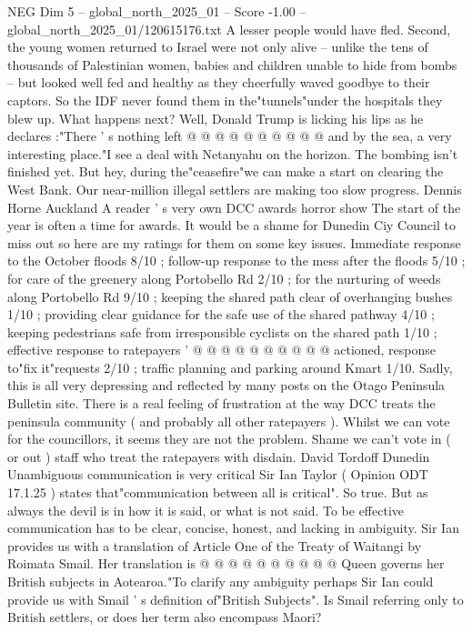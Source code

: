 \begin{textsample}{NEG Dim 5 – global\_north\_2025\_01 – Score -1.00 – global\_north\_2025\_01/120615176.txt}
A lesser people would have fled.
Second, the young women returned to Israel were not only alive -- unlike the tens of thousands of Palestinian women, babies and children unable to hide from bombs -- but looked well fed and healthy as they cheerfully waved goodbye to their captors.
So the IDF never found them in the"tunnels"under the hospitals they blew up.
What happens next?
Well, Donald Trump is licking his lips as he declares :"There ' s nothing left @ @ @ @ @ @ @ @ @ @ and by the sea, a very interesting place."I see a deal with Netanyahu on the horizon.
The bombing isn't finished yet.
But hey, during the"ceasefire"we can make a start on clearing the West Bank.
Our near-million illegal settlers are making too slow progress.
Dennis Horne Auckland A reader ' s very own DCC awards horror show The start of the year is often a time for awards.
It would be a shame for Dunedin Ciy Council to miss out so here are my ratings for them on some key issues.
Immediate response to the October floods 8/10 ; follow-up response to the mess after the floods 5/10 ; for care of the greenery along Portobello Rd 2/10 ; for the nurturing of weeds along Portobello Rd 9/10 ; keeping the shared path clear of overhanging bushes 1/10 ; providing clear guidance for the safe use of the shared pathway 4/10 ; keeping pedestrians safe from irresponsible cyclists on the shared path 1/10 ; effective response to ratepayers ' @ @ @ @ @ @ @ @ @ @ actioned, response to"fix it"requests 2/10 ; traffic planning and parking around Kmart 1/10.
Sadly, this is all very depressing and reflected by many posts on the Otago Peninsula Bulletin site.
There is a real feeling of frustration at the way DCC treats the peninsula community ( and probably all other ratepayers ).
Whilst we can vote for the councillors, it seems they are not the problem.
Shame we can't vote in ( or out ) staff who treat the ratepayers with disdain.
David Tordoff Dunedin Unambiguous communication is very critical Sir Ian Taylor ( Opinion ODT 17.1.25 ) states that"communication between all is critical".
So true.
But as always the devil is in how it is said, or what is not said.
To be effective communication has to be clear, concise, honest, and lacking in ambiguity.
Sir Ian provides us with a translation of Article One of the Treaty of Waitangi by Roimata Smail.
Her translation is @ @ @ @ @ @ @ @ @ @ Queen governs her British subjects in Aotearoa."To clarify any ambiguity perhaps Sir Ian could provide us with Smail ' s definition of"British Subjects".
Is Smail referring only to British settlers, or does her term also encompass Maori?

\end{textsample}
